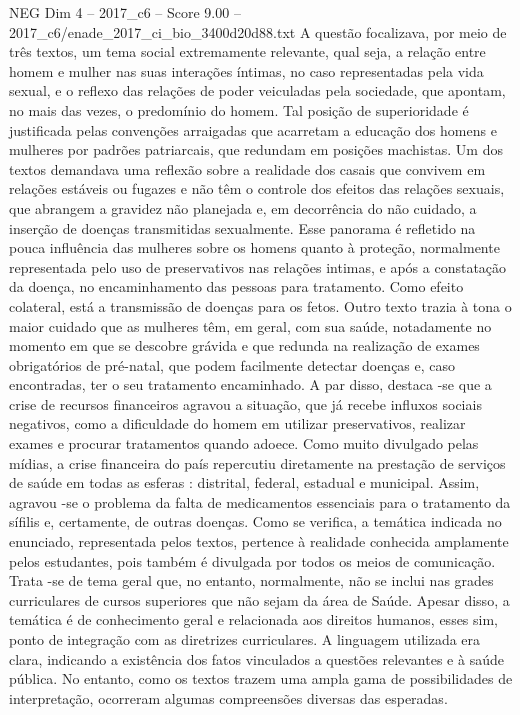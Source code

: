 \begin{textsample}{NEG Dim 4 – 2017\_c6 – Score 9.00 – 2017\_c6/enade\_2017\_ci\_bio\_3400d20d88.txt}
A questão focalizava, por meio de três textos, um tema social extremamente relevante, qual seja, a relação entre homem e mulher nas suas interações íntimas, no caso representadas pela vida sexual, e o reflexo das relações de poder veiculadas pela sociedade, que apontam, no mais das vezes, o predomínio do homem.
Tal posição de superioridade é justificada pelas convenções arraigadas que acarretam a educação dos homens e mulheres por padrões patriarcais, que redundam em posições machistas.
Um dos textos demandava uma reflexão sobre a realidade dos casais que convivem em relações estáveis ou fugazes e não têm o controle dos efeitos das relações sexuais, que abrangem a gravidez não planejada e, em decorrência do não cuidado, a inserção de doenças transmitidas sexualmente.
Esse panorama é refletido na pouca influência das mulheres sobre os homens quanto à proteção, normalmente representada pelo uso de preservativos nas relações intimas, e após a constatação da doença, no encaminhamento das pessoas para tratamento.
Como efeito colateral, está a transmissão de doenças para os fetos.
Outro texto trazia à tona o maior cuidado que as mulheres têm, em geral, com sua saúde, notadamente no momento em que se descobre grávida e que redunda na realização de exames obrigatórios de pré-natal, que podem facilmente detectar doenças e, caso encontradas, ter o seu tratamento encaminhado.
A par disso, destaca -se que a crise de recursos financeiros agravou a situação, que já recebe influxos sociais negativos, como a dificuldade do homem em utilizar preservativos, realizar exames e procurar tratamentos quando adoece.
Como muito divulgado pelas mídias, a crise financeira do país repercutiu diretamente na prestação de serviços de saúde em todas as esferas : distrital, federal, estadual e municipal.
Assim, agravou -se o problema da falta de medicamentos essenciais para o tratamento da sífilis e, certamente, de outras doenças.
Como se verifica, a temática indicada no enunciado, representada pelos textos, pertence à realidade conhecida amplamente pelos estudantes, pois também é divulgada por todos os meios de comunicação.
Trata -se de tema geral que, no entanto, normalmente, não se inclui nas grades curriculares de cursos superiores que não sejam da área de Saúde.
Apesar disso, a temática é de conhecimento geral e relacionada aos direitos humanos, esses sim, ponto de integração com as diretrizes curriculares.
A linguagem utilizada era clara, indicando a existência dos fatos vinculados a questões relevantes e à saúde pública.
No entanto, como os textos trazem uma ampla gama de possibilidades de interpretação, ocorreram algumas compreensões diversas das esperadas.

\end{textsample}
